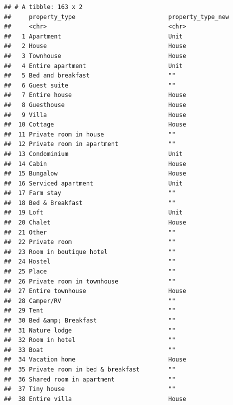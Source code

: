 \documentclass[]{article}
\begin{document}
\begin{verbatim}
## # A tibble: 163 x 2
##     property_type                          property_type_new
##     <chr>                                  <chr>            
##   1 Apartment                              Unit             
##   2 House                                  House            
##   3 Townhouse                              House            
##   4 Entire apartment                       Unit             
##   5 Bed and breakfast                      ""               
##   6 Guest suite                            ""               
##   7 Entire house                           House            
##   8 Guesthouse                             House            
##   9 Villa                                  House            
##  10 Cottage                                House            
##  11 Private room in house                  ""               
##  12 Private room in apartment              ""               
##  13 Condominium                            Unit             
##  14 Cabin                                  House            
##  15 Bungalow                               House            
##  16 Serviced apartment                     Unit             
##  17 Farm stay                              ""               
##  18 Bed & Breakfast                        ""               
##  19 Loft                                   Unit             
##  20 Chalet                                 House            
##  21 Other                                  ""               
##  22 Private room                           ""               
##  23 Room in boutique hotel                 ""               
##  24 Hostel                                 ""               
##  25 Place                                  ""               
##  26 Private room in townhouse              ""               
##  27 Entire townhouse                       House            
##  28 Camper/RV                              ""               
##  29 Tent                                   ""               
##  30 Bed &amp; Breakfast                    ""               
##  31 Nature lodge                           ""               
##  32 Room in hotel                          ""               
##  33 Boat                                   ""               
##  34 Vacation home                          House            
##  35 Private room in bed & breakfast        ""               
##  36 Shared room in apartment               ""               
##  37 Tiny house                             ""               
##  38 Entire villa                           House            

\end{verbatim}
\end{document}
